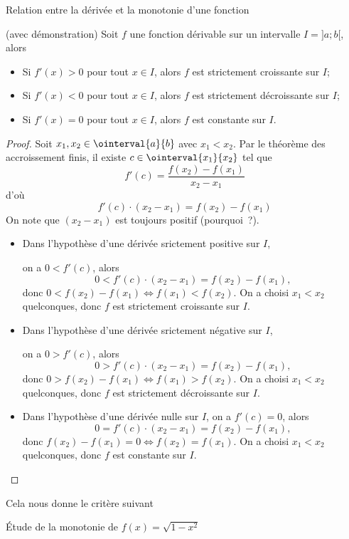 \begin{thm}
	Relation entre la dérivée et la monotonie d'une fonction

	(avec démonstration)
	\tcblower
	Soit $f$ une fonction dérivable sur un intervalle $I=]a;b[$, alors  
	\begin{itemize}
		\item Si $f'(x)>0$ pour tout $x\in I$, alors $f$ est strictement croissante sur $I$;
		\item Si $f'(x)<0$ pour tout $x\in I$, alors $f$ est strictement décroissante sur $I$;
		\item Si $f'(x)=0$ pour tout $x\in I$, alors $f$ est constante sur $I$.
	\end{itemize}
	\begin{proof}
		Soit $x_1,x_2\in \ointerval{a}{b}$ avec $x_1<x_2$. Par le théorème des accroissement finis, il existe $c\in\ointerval{x_1}{x_2}$ tel que 
		\[f'(c)=\dfrac{f(x_2)-f(x_1)}{x_2-x_1}\]
		d'où
		\[f'(c)\cdot (x_2-x_1)=f(x_2)-f(x_1)\]
		On note que $(x_2-x_1)$ est toujours positif (pourquoi~?).
		\begin{itemize}
			\item Dans l'hypothèse d'une dérivée srictement positive sur $I$,

				on a $0<f'(c)$, alors 
				\[0<f'(c)\cdot (x_2-x_1)=f(x_2)-f(x_1),\]
				donc $0<f(x_2)-f(x_1) \iff f(x_1)<f(x_2)$. On a choisi $x_1<x_2$ quelconques, donc $f$ est strictement croissante sur $I$. 
			\item Dans l'hypothèse d'une dérivée srictement négative sur $I$, 

				on a $0>f'(c)$, alors 
				\[0>f'(c)\cdot (x_2-x_1)=f(x_2)-f(x_1),\]
				donc $0>f(x_2)-f(x_1) \iff f(x_1)>f(x_2)$. On a choisi $x_1<x_2$ quelconques, donc $f$ est strictement décroissante sur $I$. 
			\item Dans l'hypothèse d'une dérivée nulle sur $I$, on a $f'(c)=0$, alors 
				\[0=f'(c)\cdot (x_2-x_1)=f(x_2)-f(x_1),\]
				donc $f(x_2)-f(x_1)=0 \iff f(x_2)=f(x_1)$. On a choisi $x_1<x_2$ quelconques, donc $f$ est constante sur $I$. 
		\end{itemize}

	\end{proof}
\end{thm}
\begin{formule}
	\tcblower
	Cela nous donne le critère suivant 
\end{formule}
\begin{exemple}
	\tcblower
	Étude de la monotonie de $f(x)=\sqrt{1-x^2}$
	\vspace{6cm}	
\end{exemple}

